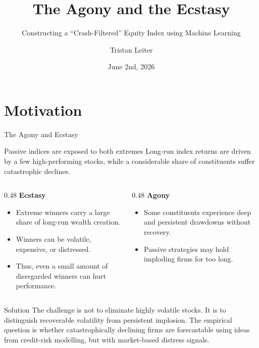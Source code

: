 \documentclass[10pt]{beamer}\usepackage[]{graphicx}\usepackage[table]{xcolor}
\title[The Agony and the Ecstasy]{The Agony and the Ecstasy}
\subtitle{Constructing a ``Crash-Filtered'' Equity Index using Machine Learning}
\author{Tristan Leiter}
\institute[WU]{Vienna University of Business and Economics \\
        \medskip
        \scriptsize Supervisor: Prof. Kurt Hornik}
\date{June 2nd, 2026}
\newcommand{\sourcefoot}[1]{\vspace{0.25em}{\tiny \textit{Source:} #1}}
\begin{document}
\begin{frame}
  \titlepage
\end{frame}


\section{Motivation}
\begin{frame}{The Agony and Ecstasy}
\small
\begin{alertblock}{Passive indices are exposed to both extremes}
Long-run index returns are driven by a few high-performing stocks, while a considerable share of constituents suffer catastrophic declines.
\end{alertblock}

\vspace{0.35em}
\begin{columns}[t]
\begin{column}{0.48\textwidth}
\textbf{Ecstasy}
\begin{itemize}
  \item Extreme winners carry a large share of long-run wealth creation.
  \item Winners can be volatile, expensive, or distressed.
  \item Thus, even a small amount of disregarded winners can hurt performance.
\end{itemize}
\end{column}
\begin{column}{0.48\textwidth}
\textbf{Agony}
\begin{itemize}
  \item Some constituents experience deep and persistent drawdowns without recovery.
  \item Passive strategies may hold imploding firms for too long.
\end{itemize}
\end{column}
\end{columns}

\vspace{0.35em}
\begin{block}{Solution}
\scriptsize
The challenge is not to eliminate highly volatile stocks. It is to distinguish recoverable volatility from persistent implosion. The empirical question is whether catastrophically declining firms are forecastable using ideas from credit-risk modelling, but with market-based distress signals.
\end{block}
\end{frame}
\end{document}
